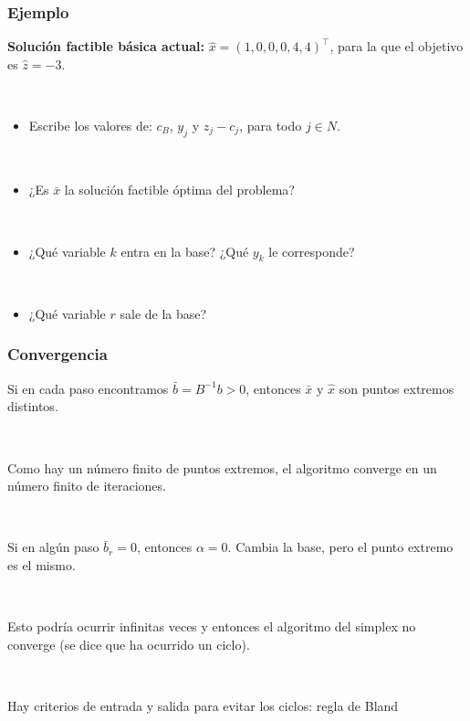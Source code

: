 \documentclass{beamer}
\begin{document}
\begin{frame}
\frametitle{Ejemplo}

\textbf{Solución factible básica actual:} $\hat{x}=(1,0,0,0,4,4)^\top$, para la que el objetivo es $\hat{z}=-3$.

\
\

\begin{itemize}

\item Escribe los valores de:  $c_B$, $y_j$ y $z_j-c_j$, para todo $j\in N$.

\

\item ¿Es $\bar{x}$ la solución factible óptima del problema?

\

\item ¿Qué variable $k$ entra en la base? ¿Qué $y_k$ le corresponde?

\

\item ¿Qué variable $r$ sale de la base?


\end{itemize}


\end{frame}
\begin{frame}
\frametitle{Convergencia}

Si en cada paso encontramos $\bar{b}=B^{-1}b >0$, entonces $\bar{x}$ y $\hat{x}$ son puntos extremos distintos.

\

Como hay un número finito de puntos extremos, el algoritmo converge en un número finito de iteraciones.

\

Si en algún paso $\bar{b}_r=0$, entonces $\alpha=0$. Cambia la base, pero el punto extremo es el mismo.

\

Esto podría ocurrir infinitas veces y entonces el algoritmo del simplex no converge (se dice que ha ocurrido un ciclo).

\

Hay criterios de entrada y salida para evitar los ciclos: regla de Bland


\end{frame}
\end{document}
